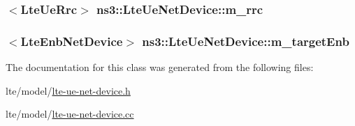 \subsubsection[{\texorpdfstring{m\+\_\+rrc}{m_rrc}}]{$<${\bf Lte\+Ue\+Rrc}$>$ ns3\+::\+Lte\+Ue\+Net\+Device\+::m\+\_\+rrc\hspace{0.3cm}{\ttfamily [private]}}\hypertarget{classns3_1_1LteUeNetDevice_a180bf4a8613e55bd2863045f607703dd}{}\label{classns3_1_1LteUeNetDevice_a180bf4a8613e55bd2863045f607703dd}
\subsubsection[{\texorpdfstring{m\+\_\+target\+Enb}{m_targetEnb}}]{$<${\bf Lte\+Enb\+Net\+Device}$>$ ns3\+::\+Lte\+Ue\+Net\+Device\+::m\+\_\+target\+Enb\hspace{0.3cm}{\ttfamily [private]}}\hypertarget{classns3_1_1LteUeNetDevice_adeb036e1f1ab5f186930dbef62edadf8}{}\label{classns3_1_1LteUeNetDevice_adeb036e1f1ab5f186930dbef62edadf8}


The documentation for this class was generated from the following files\+:\begin{DoxyCompactItemize}
\item 
lte/model/\hyperlink{lte-ue-net-device_8h}{lte-\/ue-\/net-\/device.\+h}\item 
lte/model/\hyperlink{lte-ue-net-device_8cc}{lte-\/ue-\/net-\/device.\+cc}\end{DoxyCompactItemize}
